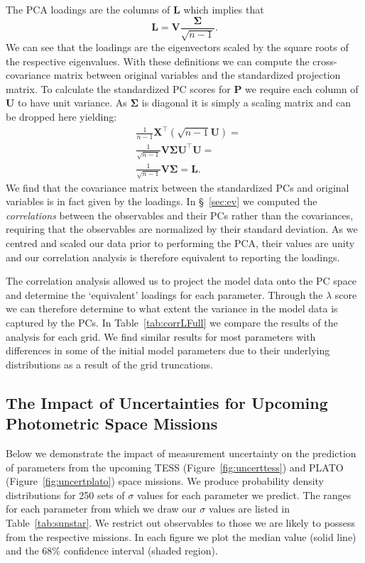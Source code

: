 The PCA loadings are the columns of \textbf{L} which implies that 
\begin{equation}
\mathbf{L}=\mathbf{V}\frac{\mathbf \Sigma}{\sqrt{n-1}}.
\end{equation}
We can see that the loadings are the eigenvectors scaled by the square roots of the respective eigenvalues.
With these definitions we can compute the cross-covariance matrix between original variables and the standardized projection matrix. 
To calculate the standardized PC scores for \textbf{P} we require each column of \textbf{U} to have unit variance. As $\mathbf{\Sigma}$ is diagonal it is simply a scaling matrix and can be dropped here yielding: 
\begin{eqnarray}
&\frac{1}{n-1}\mathbf{X}^\top(\sqrt{n-1}\mathbf{U}) = \\ &\frac{1}{\sqrt{n-1}}\mathbf{V}\mathbf{\Sigma}\mathbf{U}^\top\mathbf{U} =\\ &\frac{1}{\sqrt{n-1}}\mathbf{V}\mathbf{\Sigma}=\mathbf{L}.
\end{eqnarray}
We find that the covariance matrix between the standardized PCs and original variables is in fact given by the loadings. 
In  \S~\ref{sec:ev} we computed the \emph{correlations} between the observables and their PCs rather than the covariances, requiring that the observables are normalized by their standard deviation. As we centred and scaled our data prior to performing the PCA, their values are unity and our correlation analysis is therefore equivalent to reporting the loadings. 

The correlation analysis allowed us to project the model data onto the PC space and determine the `equivalent' loadings for each parameter. Through the $\lambda$ score we can therefore determine to what extent the variance in the model data is captured by the PCs.  In Table~\ref{tab:corrLFull} we compare the results of the analysis for each grid. We find similar results for most parameters 
with differences in some of the initial model parameters due to their underlying distributions as a result of the grid truncations.




\subsection{The Impact of Uncertainties for Upcoming Photometric Space Missions} 
Below we demonstrate the impact of measurement uncertainty on the prediction of parameters from the upcoming TESS (Figure~\ref{fig:uncerttess}) and PLATO (Figure~\ref{fig:uncertplato}) space missions.  We produce  probability density distributions for 250 sets of $\sigma$ values for each parameter we predict. The ranges for each parameter from which we draw our $\sigma$ values are listed in Table~\ref{tab:sunstar}. We restrict out observables to those we are likely to possess from the respective missions. 
In each figure we plot the median value (solid line) and the 68\%  confidence interval (shaded region).


